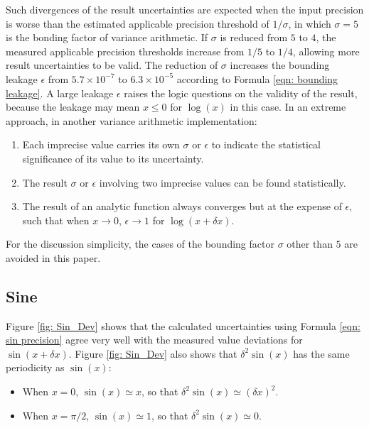 \documentclass[twoside]{article}
\numberwithin{equation}{section}
\begin{document}
Such divergences of the result uncertainties are expected when the input precision is worse than the estimated applicable precision threshold of $1/\sigma$, in which $\sigma=5$ is the bonding factor of variance arithmetic.
If $\sigma$ is reduced from $5$ to $4$, the measured applicable precision thresholds increase from $1/5$ to $1/4$, allowing more result uncertainties to be valid.
The reduction of $\sigma$ increases the bounding leakage $\epsilon$ from $5.7 \times 10^{-7}$ to $6.3 \times 10^{-5}$ according to Formula \eqref{eqn: bounding leakage}.
A large leakage $\epsilon$ raises the logic questions on the validity of the result, because the leakage may mean $x \leq 0$ for $\log(x)$ in this case.
In an extreme approach, in another variance arithmetic implementation:
\begin{enumerate}

\item Each imprecise value carries its own $\sigma$ or $\epsilon$ to indicate the statistical significance of its value to its uncertainty.

\item The result $\sigma$ or $\epsilon$ involving two imprecise values can be found statistically.

\item The result of an analytic function always converges but at the expense of $\epsilon$, such that  when $x \rightarrow 0$, $\epsilon \rightarrow 1$ for $\log(x + \delta x)$. 

\end{enumerate}
For the discussion simplicity, the cases of the bounding factor $\sigma$ other than $5$ are avoided in this paper.




\subsection{Sine}

Figure \ref{fig: Sin_Dev} shows that the calculated uncertainties using Formula \eqref{eqn: sin precision} agree very well with the measured value deviations for $\sin(x + \delta x)$.
Figure \ref{fig: Sin_Dev} also shows that $\delta^2 \sin(x)$ has the same periodicity as $\sin(x)$:
\begin{itemize}
\item When $x=0$, $\sin(x) \simeq x$, so that $\delta^2 \sin(x) \simeq (\delta x)^2$.
\item When $x=\pi/2$, $\sin(x) \simeq 1$, so that $\delta^2 \sin(x) \simeq 0$.
\end{itemize}
\end{document}
